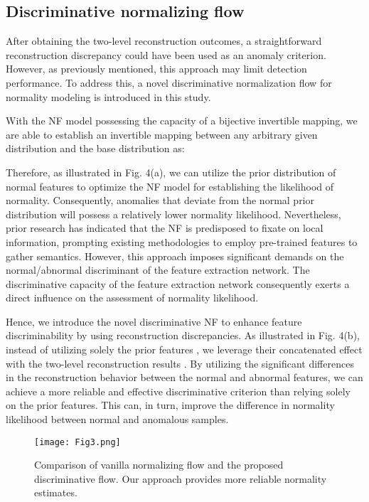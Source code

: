 \documentclass[journal]{IEEEtran}
\begin{document}
\subsection{Discriminative normalizing flow}

After obtaining the two-level reconstruction outcomes, a straightforward reconstruction discrepancy could have been used as an anomaly criterion. However, as previously mentioned, this approach may limit detection performance. To address this, a novel discriminative normalization flow for normality modeling is introduced in this study.

With the NF model  possessing the capacity of a bijective invertible mapping, we are able to establish an invertible mapping between any arbitrary given distribution  and the base distribution  as:


Therefore, as illustrated in Fig. 4(a), we can utilize the prior distribution of normal features to optimize the NF model for establishing the likelihood of normality. Consequently, anomalies that deviate from the normal prior distribution will possess a relatively lower normality likelihood. Nevertheless, prior research has indicated that the NF is predisposed to fixate on local information, prompting existing methodologies to employ pre-trained features to gather semantics. However, this approach imposes significant demands on the normal/abnormal discriminant of the feature extraction network. The discriminative capacity of the feature extraction network consequently exerts a direct influence on the assessment of normality likelihood.

Hence, we introduce the novel discriminative NF to enhance feature discriminability by using reconstruction discrepancies. As illustrated in Fig. 4(b), instead of utilizing solely the prior features , we leverage their concatenated effect with the two-level reconstruction results . 
By utilizing the significant differences in the reconstruction behavior between the normal and abnormal features, we can achieve a more reliable and effective discriminative criterion than relying solely on the prior features. This can, in turn, improve the difference in normality likelihood between normal and anomalous samples. 

\begin{figure}[t]
\centerline{\texttt{[image: Fig3.png]}}
\caption[width=8.8cm]{
Comparison of vanilla normalizing flow and the proposed discriminative flow. Our approach provides more reliable normality estimates. }
\label{fig1}
\end{figure}
\end{document}
